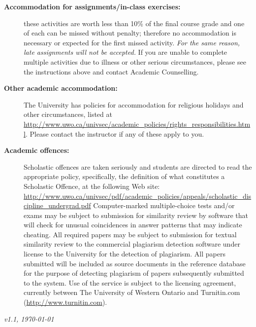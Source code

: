 \documentclass[12pt]{article}
\begin{document}
\begin{description}
\item[\bf Accommodation for assignments/in-class exercises:] these activities are worth less than 10\% of the
final course grade and one of each can be missed without penalty; therefore no accommodation is necessary or expected
for the first missed activity. {\em For the same reason, late assignments will not be accepted.} If you are unable
to complete multiple activities due to illness or other serious circumstances, please see the instructions above 
and contact Academic Counselling.

\item[\bf Other academic accommodation:] The University has policies for accommodation for religious holidays and other circumstances,
listed at \url{http://www.uwo.ca/univsec/academic_policies/rights_responsibilities.html}. Please contact the instructor if any of these apply to you.

\item[\bf Academic offences:] Scholastic offences are taken seriously and students are directed to read the
appropriate policy, specifically, the definition of what constitutes a Scholastic Offence, at the
following Web site:
\url{http://www.uwo.ca/univsec/pdf/academic_policies/appeals/scholastic_discipline_undergrad.pdf}
Computer-marked multiple-choice tests and/or exams may be subject to submission for similarity review by software that will check for unusual coincidences in answer patterns that may indicate cheating.
All required papers may be subject to submission for textual similarity review to the commercial plagiarism detection software under license to the University for the detection of plagiarism. All papers submitted will be included as source documents in the reference database for the purpose of detecting plagiarism of papers subsequently submitted to the system. Use of the service is subject to the licensing agreement, currently between The University of Western Ontario and Turnitin.com (\url{http://www.turnitin.com}).
\end{description}

{\em v1.1, \today}
\end{document}
